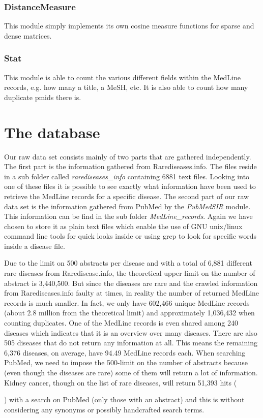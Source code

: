 \subsubsection{DistanceMeasure}
This module simply implements its own cosine measure functions for
sparse and dense matrices.

\subsubsection{Stat}
This module is able to count the various different fields within the
MedLine records, e.g. how many a title, a MeSH, etc. It is also
able to count how many duplicate pmids there is.

\section{The database\label{Database}}

Our raw data set consists mainly of two parts that are gathered
independently. The first part is the information gathered from
Rarediseases.info. The files reside in a sub folder called
\textit{rarediseases\_info} containing 6881 text files. Looking into
one of these files it is possible to see exactly what information have
been used to retrieve the MedLine records for a specific disease. The
second part of our raw data set is the information gathered from PubMed
by the \textit{PubMedSIR} module. This information can be find in the sub folder
\textit{MedLine\_records}. Again we have chosen to store it as plain
text files which enable the use of GNU unix/linux command line tools
for quick looks inside or using grep to look for specific words inside
a disease file.

Due to the limit on 500 abstracts per disease and with a total of
6,881 different rare diseases from Raredisease.info, the theoretical
upper limit on the number of abstract is 3,440,500. But since the
diseases are rare and the crawled information from Rarediseases.info
faulty at times, in reality the number of returned MedLine records is
much smaller. In fact, we only have 602,466 unique MedLine records
(about 2.8 million from the theoretical limit) and approximately
1,036,432 when counting duplicates. One of the MedLine records is even
shared among 240 diseases which indicates that it is an overview over
many diseases. There are also 505 diseases that do not return any
information at all. This means the remaining 6,376 diseases, on
average, have 94.49 MedLine records each. When searching PubMed, we
need to impose the 500-limit on the number of abstracts because (even
though the diseases are rare) some of them will return a lot of
information. Kidney cancer, though on the list of rare diseases, will
return 51,393 hits (\date{January 3, 2010}) with a search on PubMed
(only those with an abstract) and this is without considering any
synonyms or possibly handcrafted search terms.

